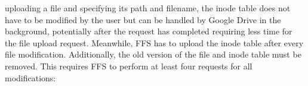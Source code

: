 uploading a file and specifying its path and filename, the inode table does not have to be modified by the user but can be handled by Google Drive in the background, potentially after the request has completed requiring less time for the file upload request. Meanwhile, \gls{FFS} has to upload the inode table after every file modification. Additionally, the old version of the file and inode table must be removed. This requires \gls{FFS} to perform at least four requests for all modifications:

